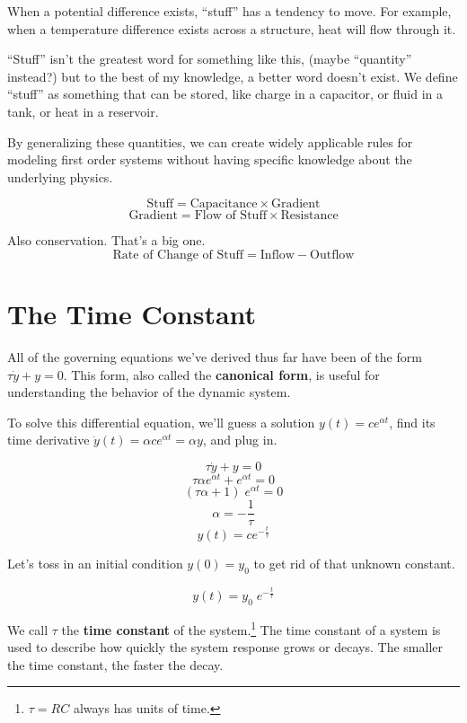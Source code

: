 \documentclass[
  letterpaper,
  DIV=11,
  numbers=noendperiod]{scrreprt}
\begin{document}
When a potential difference exists, ``stuff'' has a tendency to move.
For example, when a temperature difference exists across a structure,
heat will flow through it.

``Stuff'' isn't the greatest word for something like this, (maybe
``quantity'' instead?) but to the best of my knowledge, a better word
doesn't exist. We define ``stuff'' as something that can be stored, like
charge in a capacitor, or fluid in a tank, or heat in a reservoir.

By generalizing these quantities, we can create widely applicable rules
for modeling first order systems without having specific knowledge about
the underlying physics.

\[\text{Stuff} = \text{Capacitance} \times \text{Gradient}\]
\[\text{Gradient} = \text{Flow of Stuff} \times \text{Resistance}\]

Also conservation. That's a big one.
\[\text{Rate of Change of Stuff} = \text{Inflow} - \text{Outflow}\]

\hypertarget{the-time-constant}{%
\section{The Time Constant}\label{the-time-constant}}

All of the governing equations we've derived thus far have been of the
form \(\tau \dot{y} + y = 0\). This form, also called the
\textbf{canonical form}, is useful for understanding the behavior of the
dynamic system.

To solve this differential equation, we'll guess a solution
\(y(t) = ce^{\alpha t}\), find its time derivative
\(\dot{y}(t) = \alpha ce^{\alpha t} = \alpha y\), and plug in.

\[\tau \dot{y} + y = 0\] \[\tau \alpha e^{\alpha t} + e^{\alpha t} = 0\]
\[(\tau \alpha + 1) \; e^{\alpha t} = 0\] \[\alpha = -\frac{1}{\tau}\]
\[y(t) = ce^{-\frac{t}{\tau}}\]

Let's toss in an initial condition \(y(0)=y_0\) to get rid of that
unknown constant.

\[y(t) = y_0 \; e^{-\frac{t}{\tau}}\]

We call \(\tau\) the \textbf{time constant} of the system.\footnote{\(\tau = RC\)
  always has units of time.} The time constant of a system is used to
describe how quickly the system response grows or decays. The smaller
the time constant, the faster the decay.
\end{document}
